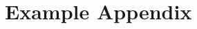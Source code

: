 \documentclass[../main.tex]{subfiles}
\begin{document}
\section{Example Appendix}
\label{appendix}
\end{document}
